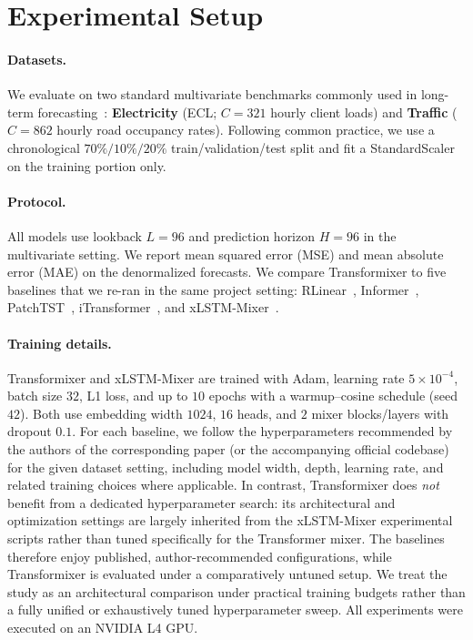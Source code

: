 \documentclass{article}
\begin{document}
\section{Experimental Setup}
\label{sec:setup}

\paragraph{Datasets.}
We evaluate on two standard multivariate benchmarks commonly used in long-term forecasting~\citep{zhou2021informer,wu2021autoformer}:
\textbf{Electricity} (ECL; $C{=}321$ hourly client loads) and \textbf{Traffic} ($C{=}862$ hourly road occupancy rates).
Following common practice, we use a chronological $70\%/10\%/20\%$ train/validation/test split and fit a StandardScaler on the training portion only.

\paragraph{Protocol.}
All models use lookback $L{=}96$ and prediction horizon $H{=}96$ in the multivariate setting.
We report mean squared error (MSE) and mean absolute error (MAE) on the denormalized forecasts.
We compare Transformixer to five baselines that we re-ran in the same project setting: RLinear~\citep{li2023rlinear}, Informer~\citep{zhou2021informer}, PatchTST~\citep{nie2023patchtst}, iTransformer~\citep{liu2024itransformer}, and xLSTM-Mixer~\citep{kraus2024xlstmmixer}.

\paragraph{Training details.}
Transformixer and xLSTM-Mixer are trained with Adam, learning rate $5{\times}10^{-4}$, batch size $32$, L1 loss, and up to $10$ epochs with a warmup--cosine schedule (seed $42$).
Both use embedding width $1024$, $16$ heads, and $2$ mixer blocks/layers with dropout $0.1$.
For each baseline, we follow the hyperparameters recommended by the authors of the corresponding paper (or the accompanying official codebase) for the given dataset setting, including model width, depth, learning rate, and related training choices where applicable.
In contrast, Transformixer does \emph{not} benefit from a dedicated hyperparameter search: its architectural and optimization settings are largely inherited from the xLSTM-Mixer experimental scripts rather than tuned specifically for the Transformer mixer.
The baselines therefore enjoy published, author-recommended configurations, while Transformixer is evaluated under a comparatively untuned setup.
We treat the study as an architectural comparison under practical training budgets rather than a fully unified or exhaustively tuned hyperparameter sweep.
All experiments were executed on an NVIDIA L4 GPU.
\end{document}
